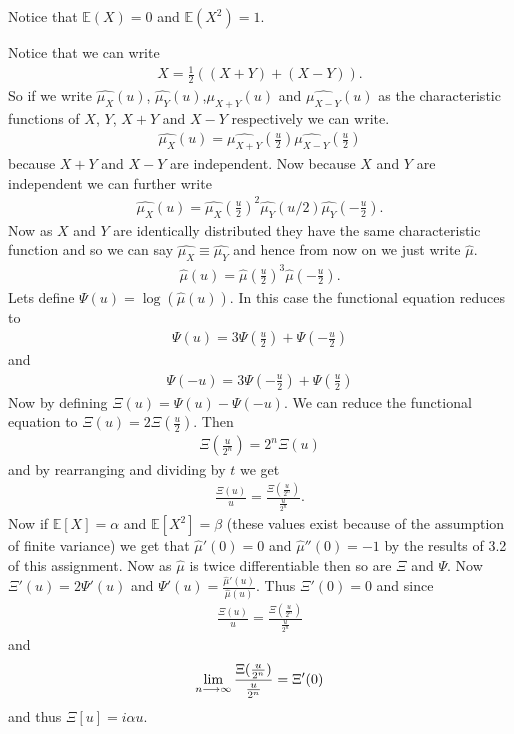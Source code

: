 \documentclass{unswmaths}
\begin{document}
Notice that $ \mathbb{E}(X) = 0 $ and $ \mathbb{E}(X^2) = 1 $.

Notice that we can write 
\begin{align}
	X = \frac{1}{2}((X+Y)+(X-Y)).
\end{align}
So if we write $ \hat{\mu_X}(u) $, $ \hat{\mu_Y}(u) $,$ \hat{\mu_{X+Y}}(u) $ and $ \hat{\mu_{X-Y}}(u)$ as the characteristic functions of $ X $, $ Y $, $X+Y $ and $ X-Y$ respectively we can write.
\begin{align}
	\hat{\mu_X}(u) =  \hat{\mu_{X+Y}}(\frac{u}{2}) \hat{\mu_{X-Y}}(\frac{u}{2})
\end{align}
because $ X+Y $ and $ X-Y $ are independent.
Now because $ X $ and $ Y $ are independent we can further write
\begin{align}
\hat{\mu_X}(u) = \hat{\mu_X}(\frac{u}{2})^2 \hat{\mu_Y}(u/2)\hat{\mu_Y}(-\frac{u}{2}).
\end{align}
Now as $ X $ and $ Y $ are identically distributed they have the same characteristic function and so we can say $ \hat{\mu_X} \equiv \hat{\mu_Y} $ and hence from now on we just write $ \hat{\mu} $.
\begin{align}
	\hat{\mu}(u) = \hat{\mu}(\frac{u}{2})^3\hat{\mu}(-\frac{u}{2}).
\end{align}
Lets define $ \Psi(u) = \log(\hat{\mu}(u)) $. In this case the functional equation reduces to
\begin{align}
	\Psi(u) = 3 \Psi(\frac{u}{2}) + \Psi(-\frac{u}{2})
\end{align}
and
\begin{align}
	\Psi(-u) = 3 \Psi(-\frac{u}{2}) + \Psi(\frac{u}{2})
\end{align}
Now by defining $ \Xi(u) = \Psi(u) - \Psi(-u) $. We can reduce the functional equation to  $ \Xi(u) = 2\Xi(\frac{u}{2})$. Then
\begin{align}
	\Xi(\frac{u}{2^n}) = 2^n \Xi(u)
\end{align}
and by rearranging and dividing by $ t $ we get 
\begin{align}
	\frac{\Xi(u)}{u} = \frac{\Xi(\frac{u}{2^n})}{\frac{u}{2^n}}.
\end{align}
Now if $ \mathbb{E}[X] = \alpha $ and $ \mathbb{E}[X^2] = \beta $ (these values exist because of the assumption of finite variance) we get that
$ \hat{\mu}'(0)= 0 $ and $ \hat{\mu}''(0) = -1 $ by the results of 3.2 of this assignment. Now as $ \hat{\mu} $ is twice differentiable then so are $ \Xi $ and $ \Psi $.
Now $ \Xi'(u) = 2\Psi'(u) $ and $ \Psi'(u) = \frac{\hat{\mu}'(u)}{\hat{\mu}(u)} $. Thus $ \Xi'(0) = 0 $ and since
\begin{align}
	\frac{\Xi(u)}{u} =\frac{\Xi(\frac{u}{2^n})}{\frac{u}{2^n}}
\end{align}
and 
\begin{align}
	\lim_{n\longrightarrow\infty} \frac{\Xi(\frac{u}{2^n})}{\frac{u}{2^n}} = \Xi'(0)
\end{align}
and thus $ \Xi[u] = i\alpha u $. 
\end{document}
